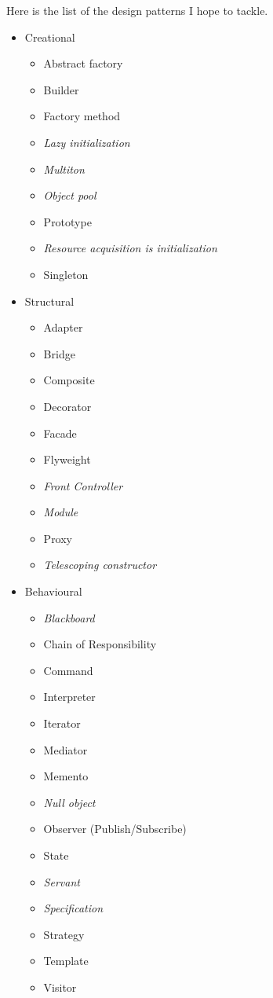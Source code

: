 \documentclass[12pt, oneside]{book} %
\begin{document}
Here is the list of the design patterns I hope to tackle.
\begin{itemize}

\item Creational

\begin{itemize}
\item Abstract factory
\item Builder
\item Factory method
\item \emph{Lazy initialization}
\item \emph{Multiton}
\item \emph{Object pool}
\item Prototype
\item \emph{Resource acquisition is initialization}
\item Singleton
\end{itemize}

\item Structural

\begin{itemize}
\item Adapter
\item Bridge
\item Composite
\item Decorator
\item Facade
\item Flyweight
\item \emph{Front Controller}
\item \emph{Module}
\item Proxy
\item \emph{Telescoping constructor}
\end{itemize}

\item Behavioural

\begin{itemize}
\item \emph{Blackboard}
\item Chain of Responsibility
\item Command
\item Interpreter
\item Iterator
\item Mediator
\item Memento
\item \emph{Null object}
\item Observer (Publish/Subscribe)
\item State
\item \emph{Servant}
\item \emph{Specification}
\item Strategy
\item Template
\item Visitor
\end{itemize}


\end{itemize}
\end{document}
